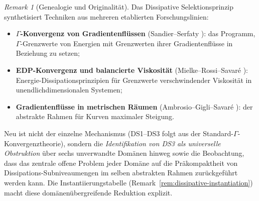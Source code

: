 \documentclass[12pt,a4paper]{article}
\theoremstyle{definition}
\theoremstyle{remark}
\newtheorem{remark}[theorem]{Remark}
\begin{document}
\begin{remark}[Genealogie und Originalit\"at]\label{rem:ds-genealogy}
Das Dissipative Selektionsprinzip synthetisiert Techniken aus mehreren etablierten Forschungslinien:
\begin{itemize}
\item \textbf{$\Gamma$-Konvergenz von Gradientenfl\"ussen} (Sandier--Serfaty \cite{SandierSerfaty2004}): das Programm, $\Gamma$-Grenzwerte von Energien mit Grenzwerten ihrer Gradientenfl\"usse in Beziehung zu setzen;
\item \textbf{EDP-Konvergenz und balancierte Viskosit\"at} (Mielke--Rossi--Savar\'e \cite{MielkeRossiSavare2016}): Energie-Dissipationsprinzipien f\"ur Grenzwerte verschwindender Viskosit\"at in unendlichdimensionalen Systemen;
\item \textbf{Gradientenfl\"usse in metrischen R\"aumen} (Ambrosio--Gigli--Savar\'e \cite{AGS2008}): der abstrakte Rahmen f\"ur Kurven maximaler Steigung.
\end{itemize}
Neu ist nicht der einzelne Mechanismus (DS1--DS3 folgt aus der Standard-$\Gamma$-Konvergenztheorie), sondern die \emph{Identifikation von DS3 als universelle Obstruktion} \"uber sechs unverwandte Dom\"anen hinweg sowie die Beobachtung, dass das zentrale offene Problem jeder Dom\"ane auf die Pr\"akompaktheit von Dissipations-Subniveaumengen im selben abstrakten Rahmen zur\"uckgef\"uhrt werden kann. Die Instantiierungstabelle (Remark~\ref{rem:dissipative-instantiation}) macht diese dom\"anen\"ubergreifende Reduktion explizit.
\end{remark}
\end{document}
